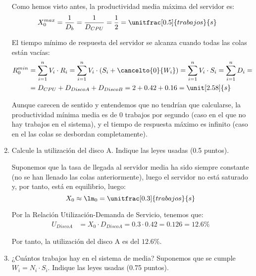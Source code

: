 \documentclass[12pt]{article}
\begin{document}
\begin{ejercicio}[2 puntos]
\begin{enumerate}
            Como hemos visto antes, la productividad media máxima del servidor es:
            \begin{align*}
                X_0^{max} &= \frac{1}{D_b} = \frac{1}{D_{CPU}} = \frac{1}{2} = \unitfrac[0.5]{trabajos}{s}
            \end{align*}

            El tiempo mínimo de respuesta del servidor se alcanza cuando todas las colas están vacías:
            \begin{align*}
                R_{0}^{min} &= \sum_{i=1}^{n} V_i\cdot R_i = \sum_{i=1}^{n} V_i\cdot (S_i + \cancelto{0}{W_i})
                = \sum_{i=1}^{n} V_i\cdot S_i
                = \sum_{i=1}^{n} D_i
                =\\&= D_{CPU} + D_{Disco A} + D_{Disco B} = 2 + 0.42 + 0.16 = \unit[2.58]{s}
            \end{align*}

            Aunque carecen de sentido y entendemos que no tendrían que calcularse, la productividad mínima media es de $0$ trabajos por segundo (caso en el que no hay trabajos en el sistema), y el tiempo de respuesta máximo es infinito (caso en el las colas se desbordan completamente).
            \item Calcule la utilización del disco A. Indique las leyes usadas (0.5 puntos).
            
            Suponemos que la tasa de llegada al servidor media ha sido siempre constante (no se han llenado las colas anteriormente), luego el servidor no está saturado y, por tanto, está en equilibrio, luego:
            \begin{equation*}
                X_0 \approx \lm_0 = \unitfrac[0.3]{trabajos}{s}
            \end{equation*}

            Por la Relación Utilización-Demanda de Servicio, tenemos que:
            \begin{align*}
                U_{Disco A} &= X_0\cdot D_{Disco A} = 0.3\cdot 0.42 = 0.126 = 12.6\%
            \end{align*}

            Por tanto, la utilización del disco A es del $12.6\%$.
            
            
            \item ¿Cuántos trabajos hay en el sistema de media? Suponemos que se cumple $W_i = N_i\cdot S_i$. Indique las leyes usadas (0.75 puntos).
            

\end{enumerate}
\end{ejercicio}
\end{document}

